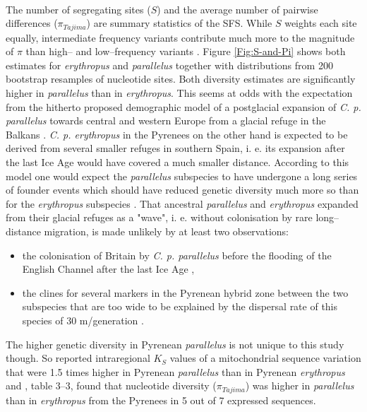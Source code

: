 \documentclass[a4paper,12pt,times,print,index,custombib,custommargin]{PhDThesisPSnPDF}\usepackage[]{graphicx}\usepackage[]{color}
\begin{document}
%
\\
The number of segregating sites ($S$) and the average number of pairwise differences ($\pi_{Tajima}$) are summary statistics of the \gls{SFS}. While $S$ weights each site equally, intermediate frequency variants contribute much more to the magnitude of $\pi$ than high-- and low--frequency variants \cite[eq. 1.4]{Wakeley2009}. Figure \ref{Fig:S-and-Pi} shows both estimates for \textit{erythropus} and \textit{parallelus} together with distributions from 200 bootstrap resamples of nucleotide sites. Both diversity estimates are significantly higher in \textit{parallelus} than in \textit{erythropus}. This seems at odds with the expectation from the hitherto proposed demographic model of a postglacial expansion of \textit{C. p. parallelus} towards central and western Europe from a glacial refuge in the Balkans \citep{Cooper1995, Lunt1998}. \textit{C. p. erythropus} in the Pyrenees on the other hand is expected to be derived from several smaller refuges in southern Spain, i. e. its expansion after the last Ice Age would have covered a much smaller distance. According to this model one would expect the \textit{parallelus} subspecies to have undergone a long series of founder events which should have reduced genetic diversity much more so than for the \textit{erythropus} subspecies \citep{Luca2011}. That ancestral \textit{parallelus} and \textit{erythropus} expanded from their glacial refuges as a "wave", i. e. without colonisation by rare long--distance migration, is made unlikely by at least two observations: 
\begin{itemize}
\item the colonisation of Britain by \textit{C. p. parallelus} before the flooding of the English Channel after the last Ice Age \citep{Cooper1995},
\item the clines for several markers in the Pyrenean hybrid zone between the two subspecies that are too wide to be explained by the dispersal rate of this species of 30 m/generation \citep{Nichols1994}. 
\end{itemize}
The higher genetic diversity in Pyrenean \textit{parallelus} is not unique to this study though. So reported \cite{Lunt1998} intraregional $K_{S}$ values of a mitochondrial sequence variation that were 1.5 times higher in Pyrenean \textit{parallelus} than in Pyrenean \textit{erythropus} and \cite{Llewellyn2008}, table 3--3, found that nucleotide diversity ($\pi_{Tajima}$) was higher in \textit{parallelus} than in \textit{erythropus} from the Pyrenees in 5 out of 7 expressed sequences.
\end{document}
